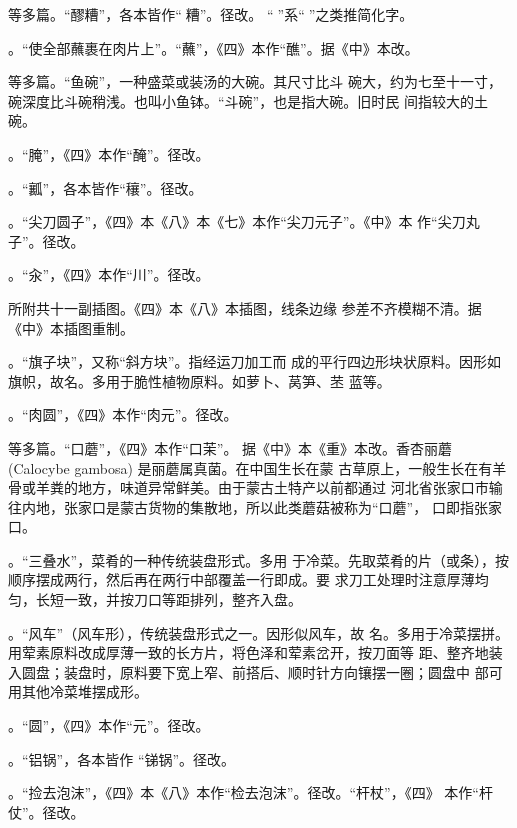 \begin{list}{}
等多篇。“醪糟”，各本皆作“𰪿糟”。径改。
“𰪿”系“𫃑”之类推简化字。

。“使全部蘸裹在肉片上”。“蘸”，《四》本作“醮”。据《中》本改。

等多篇。“鱼碗”，一种盛菜或装汤的大碗。其尺寸比斗
碗大，约为七至十一寸，碗深度比斗碗稍浅。也叫小鱼钵。“斗碗”，也是指大碗。旧时民
间指较大的土碗。

。“腌”，《四》本作“醃”。径改。

。“瓤”，各本皆作“穰”。径改。

。“尖刀圆子”，《四》本《八》本《七》本作“尖刀元子”。《中》本
作“尖刀丸子”。径改。

。“汆”，《四》本作“川”。径改。

所附共十一副插图。《四》本《八》本插图，线条边缘
参差不齐模糊不清。据《中》本插图重制。

。“旗子块”，又称“斜方块”。指经运刀加工而
成的平行四边形块状原料。因形如旗帜，故名。多用于脆性植物原料。如萝卜、莴笋、苤
蓝等。

。“肉圆”，《四》本作“肉元”。径改。

等多篇。“口蘑”，《四》本作“口茉”。
据《中》本《重》本改。香杏丽蘑 (Calocybe gambosa) 是丽蘑属真菌。在中国生长在蒙
古草原上，一般生长在有羊骨或羊粪的地方，味道异常鲜美。由于蒙古土特产以前都通过
河北省张家口市输往内地，张家口是蒙古货物的集散地，所以此类蘑菇被称为“口蘑”，
口即指张家口。

。“三叠水”，菜肴的一种传统装盘形式。多用
于冷菜。先取菜肴的片（或条），按顺序摆成两行，然后再在两行中部覆盖一行即成。要
求刀工处理时注意厚薄均匀，长短一致，并按刀口等距排列，整齐入盘。

。“风车”（风车形），传统装盘形式之一。因形似风车，故
名。多用于冷菜摆拼。用荤素原料改成厚薄一致的长方片，将色泽和荤素岔开，按刀面等
距、整齐地装入圆盘；装盘时，原料要下宽上窄、前搭后、顺时针方向镶摆一圈；圆盘中
部可用其他冷菜堆摆成形。

。“圆”，《四》本作“元”。径改。

。“铝锅”，各本皆作
“锑锅”。\xeCJKnobreak{}径改。

。“捡去泡沫”，《四》本《八》本作“检去泡沫”。径改。“杆杖”，《四》
本作“杆仗”。径改。


\end{list}
